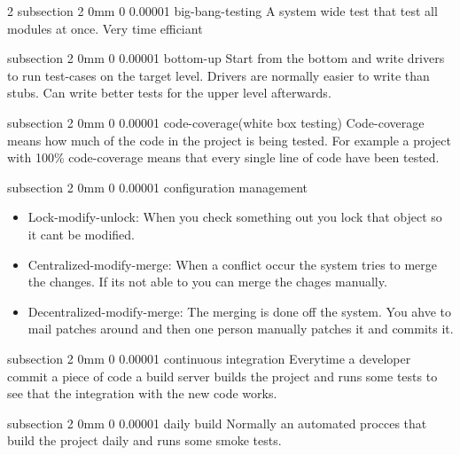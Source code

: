\documentclass[a4paper,11pt]{article}
\makeatletter
\renewcommand{\subsection}{\@startsection
   {subsection}%
   {2}%
   {0mm}%
   {0\baselineskip}%
   {0.00001\baselineskip}%
   {\rmfamily\normalfont\slshape\normalsize}}%
\makeatother
\begin{document}
\begin{multicols}{2}
 \subsection{big-bang-testing}
A system wide test that test all modules at once. Very time efficiant

\subsection{bottom-up}
Start from the bottom and write drivers to run test-cases on the target level. Drivers are normally easier to write than stubs. Can write better tests for the upper level afterwards.
 
 \subsection{code-coverage(white box testing)}
Code-coverage means how much of the code in the project is being tested. For example a project with 100\% code-coverage means that every single line of code have been tested. 

\subsection{configuration management}
\vspace{0 mm}
\begin{itemize}
 \setlength\itemsep{0em}
\item Lock-modify-unlock: When you check something out you lock that object so it cant be modified.
\item Centralized-modify-merge: When a conflict occur the system tries to merge the changes. If its not able to you can merge the chages manually.
\item Decentralized-modify-merge: The merging is done off the system. You ahve to mail patches around and then one person manually patches it and commits it. 
\end{itemize}
 
 \subsection{continuous integration}
Everytime a developer commit a piece of code a build server builds the project and runs some tests to see that the integration with the new code works.
 
 \subsection{daily build}
Normally an automated procces that build the project daily and runs some smoke tests.
 

\end{multicols}
\end{document}
